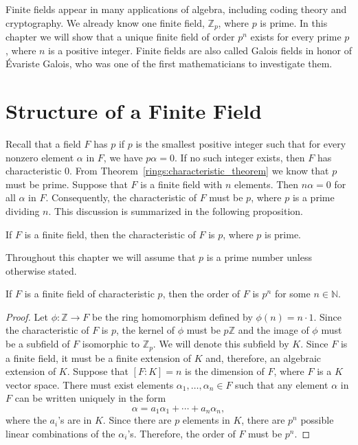 

Finite fields appear in many applications of algebra, including coding theory and cryptography.  We already know one finite field, ${\mathbb Z}_p$, where $p$ is prime.  In this chapter we will show that a unique finite field of order $p^n$ exists for every prime $p$, where $n$ is a positive integer.  Finite fields are also called Galois fields in honor of \'{E}variste Galois, who was one of the first mathematicians to
investigate them.

 
\section{Structure of a Finite Field}

Recall that a field $F$ has  $p$ if $p$ is the smallest positive integer such that for every nonzero element $\alpha$ in $F$, we have $p \alpha = 0$.  If no such integer exists, then $F$ has characteristic 0.  From Theorem~\ref{rings:characteristic_theorem} we know that $p$ must be prime.  Suppose that $F$ is a finite field with $n$ elements. Then $n \alpha = 0$ for all $\alpha$ in $F$.  Consequently, the characteristic of $F$ must be $p$, where $p$ is a prime dividing $n$.  This discussion is summarized in the following proposition.   

\begin{proposition}
If $F$ is a finite field, then the characteristic of $F$ is $p$, where $p$ is prime.
\end{proposition}

Throughout this chapter we will assume that $p$ is a prime number unless otherwise stated.  

\begin{proposition}
If $F$ is a finite field of characteristic $p$, then the order of $F$ is $p^n$ for some $n \in {\mathbb N}$.   
\end{proposition}

\begin{proof}
Let $\phi : {\mathbb Z} \rightarrow F$ be the ring homomorphism defined by $\phi(n) = n \cdot 1$.  Since the characteristic of $F$ is $p$, the kernel of $\phi$ must be $p {\mathbb Z}$ and the image of $\phi$ must be a subfield of $F$ isomorphic to ${\mathbb Z}_p$.  We will denote this subfield by $K$.  Since $F$ is a finite field, it must be a finite extension of $K$ and, therefore, an algebraic extension of $K$. Suppose that $[F : K] = n$ is the dimension of $F$, where $F$ is a $K$ vector space.  There must exist elements $\alpha_1, \ldots, \alpha_n \in F$ such that any element $\alpha$ in $F$ can be written uniquely in the form   
\[
\alpha = a_1 \alpha_1 + \cdots + a_n \alpha_n,
\]
where the $a_i$'s are in $K$.  Since there are $p$ elements in $K$, there are $p^n$ possible linear combinations of the $\alpha_i$'s.  Therefore, the order of $F$ must be $p^n$.  
\end{proof}

